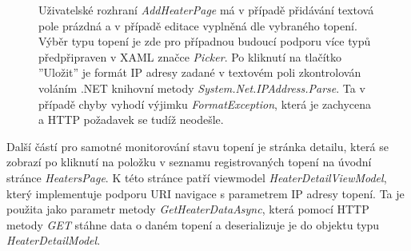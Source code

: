 \begin{figure}[hbt]
\centering
{}
\caption{Uživatelské rozhraní {\it AddHeaterPage} má v případě přidávání textová pole prázdná a v případě editace vyplněná dle vybraného topení. Výběr typu topení je zde pro případnou budoucí podporu více typů předpřipraven v XAML značce {\it Picker}. Po kliknutí na tlačítko ''Uložit'' je formát IP adresy zadané v textovém poli zkontrolován voláním .NET knihovní metody {\it System.Net.IPAddress.Parse}. Ta v případě chyby vyhodí výjimku {\it FormatException}, která je zachycena a HTTP požadavek se tudíž neodešle.}
\end{figure}

Další částí pro samotné monitorování stavu topení je stránka detailu, která se zobrazí po kliknutí na položku v seznamu registrovaných topení na úvodní stránce {\it HeatersPage}. K této stránce patří viewmodel {\it HeaterDetailViewModel}, který implementuje podporu URI navigace s parametrem IP adresy topení. Ta je použita jako parametr metody {\it GetHeaterDataAsync}, která pomocí HTTP metody {\it GET} stáhne data o daném topení a deserializuje je do objektu typu {\it HeaterDetailModel}.

